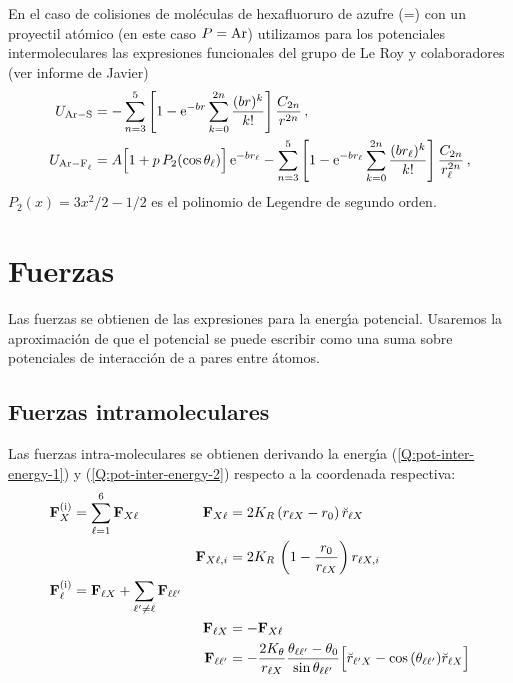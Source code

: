 En el caso de colisiones de mol\'{e}culas de hexafluoruro de azufre (=) con un proyectil at\'{o}mico (en este caso $P=\ce{Ar}$) utilizamos para los potenciales intermoleculares las expresiones funcionales del grupo de Le Roy \autocite{Eichena1988TJCPp2898} y colaboradores (ver informe de Javier)
\begin{subequations}
  \begin{align} \label{Q:pot-inter-energy-1}
    U_{\ce{Ar-S}} &= - \sum_{n=3}^{5} \left[ 1 - \rme^{-br} \sum_{k=0}^{2n}\frac{(br)^{k}}{k!}\right] \frac{C_{2n}}{r^{2n}} \,,    \\
 \label{Q:pot-inter-energy-2}   U_{\ce{Ar-F_{\ell}}} &= A \Big[1 + p\, P_{2}(\cos \theta_{\ell})\Big]\, \rme^{-b r_{\ell}} - \sum_{n=3}^{5} \left[ 1 - \rme^{-br_{\ell}} \sum_{k=0}^{2n}\frac{(br_{\ell})^{k}}{k!}\right] \frac{C_{2n}}{r_{\ell}^{2n}}\,,
  \end{align}
\end{subequations}
$P_{2}(x)= 3 x^{2}/2 -1/2$ es el polinomio de Legendre de segundo orden.


\section{Fuerzas}
\label{S:calculo-fuerzas}
Las fuerzas se obtienen de las expresiones para la energ\'{\i}a potencial. Usaremos la aproximaci\'{o}n de que el potencial se puede escribir como una suma sobre potenciales de interacci\'{o}n de a pares entre \'{a}tomos. 

\subsection{Fuerzas intramoleculares}
Las fuerzas intra-moleculares se obtienen derivando la energ\'{\i}a (\ref{Q:pot-inter-energy-1}) y (\ref{Q:pot-inter-energy-2}) respecto a la coordenada respectiva:
%
\begin{subequations}
  \begin{align}\label{Q:F-sobre-X}
    &  \mathbf{F}^{\text{(i)}}_{X} = \sum_{\ell=1}^{6}\mathbf{F}_{X\ell} & \mathbf{F}_{X\ell} &=  2 K_{R} \, (r_{\ell X}- r_{0})\, \breve{r}_{\ell X}  \\
    & &  \mathbf{F}_{X\ell,i} &= 2 K_{R} \, \left( 1-\frac{r_{0}}{r_{\ell X}} \right) r_{\ell X,i}  \nonumber\\
    \label{Q:F-Sobre-Fl}
    &\mathbf{F}^{\text{(i)}}_{\ell} =   \mathbf{F}_{\ell X} + \sum_{\ell' \ne \ell} \mathbf{F}_{\ell \ell'} & \\
    &  & \mathbf{F}_{\ell X} &= -  \mathbf{F}_{X\ell} \nonumber \\
    & & \mathbf{F}_{\ell \ell'} &= -\frac{2 K_{\theta}}{r_{\ell X}} \frac{\theta_{\ell\ell'}-\theta_{0}}{\sin \theta_{\ell\ell'}} \Big[ \breve{r}_{\ell' X} - \cos{(\theta_{\ell\ell'})} \breve{r}_{\ell X} \Big] \nonumber
  \end{align}
\end{subequations}



